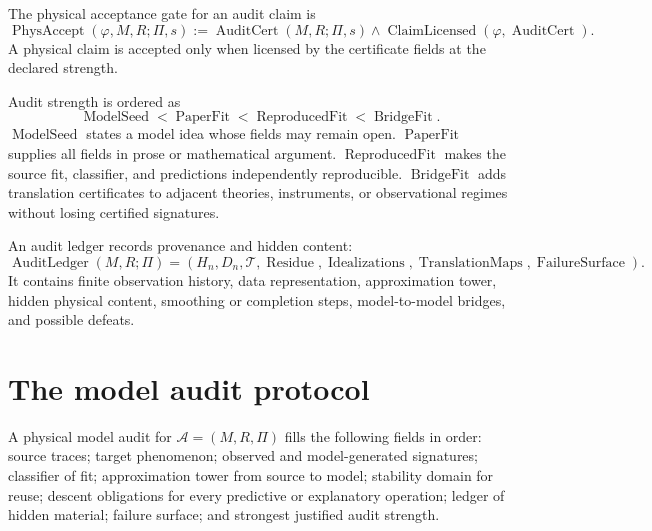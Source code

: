 \begin{definition}
\label{def:physical-acceptance-gate}
The physical acceptance gate for an audit claim is
$$
\operatorname{PhysAccept}(\varphi,M,R;\Pi,s)
:=
\operatorname{AuditCert}(M,R;\Pi,s)
\wedge
\operatorname{ClaimLicensed}(\varphi,\operatorname{AuditCert}).
$$
A physical claim is accepted only when licensed by the certificate fields at the declared strength.
\end{definition}

\begin{definition}
\label{def:audit-strength}
Audit strength is ordered as
$$
\operatorname{ModelSeed}
<
\operatorname{PaperFit}
<
\operatorname{ReproducedFit}
<
\operatorname{BridgeFit}.
$$
$\operatorname{ModelSeed}$ states a model idea whose fields may remain open. $\operatorname{PaperFit}$ supplies all fields in prose or mathematical argument. $\operatorname{ReproducedFit}$ makes the source fit, classifier, and predictions independently reproducible. $\operatorname{BridgeFit}$ adds translation certificates to adjacent theories, instruments, or observational regimes without losing certified signatures.
\end{definition}

\begin{definition}
\label{def:audit-ledger}
An audit ledger records provenance and hidden content:
$$
\operatorname{AuditLedger}(M,R;\Pi)
=
(H_n,
D_n,
\mathcal T,
\operatorname{Residue},
\operatorname{Idealizations},
\operatorname{TranslationMaps},
\operatorname{FailureSurface}).
$$
It contains finite observation history, data representation, approximation tower, hidden physical content, smoothing or completion steps, model-to-model bridges, and possible defeats.
\end{definition}

\section{The model audit protocol}
\label{sec:model-audit-protocol}

\begin{definition}
\label{def:physical-model-audit}
A physical model audit for $\mathcal A=(M,R,\Pi)$ fills the following fields in order: source traces; target phenomenon; observed and model-generated signatures; classifier of fit; approximation tower from source to model; stability domain for reuse; descent obligations for every predictive or explanatory operation; ledger of hidden material; failure surface; and strongest justified audit strength.
\end{definition}

